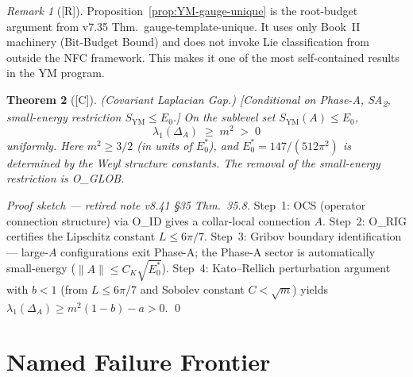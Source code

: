 \documentclass[12pt,oneside]{amsbook}
\theoremstyle{plain}
\newtheorem{theorem}{Theorem}[section]
\theoremstyle{definition}
\theoremstyle{remark}
\newtheorem{remark}[theorem]{Remark}
\newcommand{\status}[1]{\textup{[#1]}}
\begin{document}
\begin{remark}[\status{R}]
Proposition~\ref{prop:YM-gauge-unique} is the root-budget
argument from v7.35 Thm.~gauge-template-unique. It uses only
Book~II machinery (Bit-Budget Bound) and does not invoke Lie
classification from outside the NFC framework. This makes it one
of the most self-contained results in the YM program.
\end{remark}

\begin{theorem}[\status{C}]\label{thm:YM-covariant-gap}
\textup{(Covariant Laplacian Gap.)}
\textup{[Conditional on Phase-A, SA\textsubscript{2}, small-energy
restriction $S_{\mathrm{YM}} \leq E_0$.]}
On the sublevel set $S_{\mathrm{YM}}(A) \leq E_0$,
\[
 \lambda_1(\Delta_A) \;\geq\; m^2 \;>\; 0
\]
uniformly. Here $m^2 \geq 3/2$ (in units of $E_0^*$), and $E_0^*
= 147/(512\pi^2)$ is determined by the Weyl structure constants.
The removal of the small-energy restriction is O\_GLOB.
\end{theorem}

\begin{proof}[Proof sketch --- retired note v8.41 §35 Thm.~35.8]
Step~1: OCS (operator connection structure) via O\_ID gives a
collar-local connection $A$. Step~2: O\_RIG certifies the
Lipschitz constant $L \leq 6\pi/7$. Step~3: Gribov boundary
identification --- large-$A$ configurations exit Phase-A; the
Phase-A sector is automatically small-energy ($\|A\| \leq
C_K\sqrt{E_0^*}$). Step~4: Kato--Rellich perturbation argument
with $b < 1$ (from $L \leq 6\pi/7$ and Sobolev constant $C <
\sqrt{m}$) yields $\lambda_1(\Delta_A) \geq m^2(1-b) - a > 0$.
\qed
\end{proof}

\section{Named Failure Frontier}
\label{sec:frontier}
\end{document}
